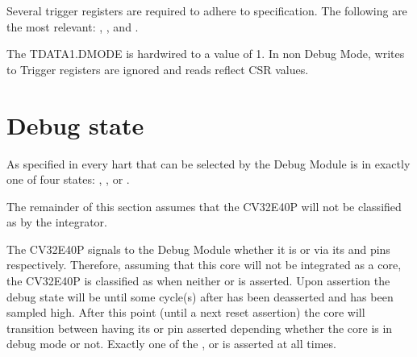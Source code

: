 \documentclass[letterpaper,10pt,english]{sphinxmanual}
\begin{document}
\sphinxAtStartPar
Several trigger registers are required to adhere to specification. The following are the most relevant: {\hyperref[\detokenize{control_status_registers:csr-tselect}]{}}, {\hyperref[\detokenize{control_status_registers:csr-tdata1}]{}},  {\hyperref[\detokenize{control_status_registers:csr-tdata2}]{}} and {\hyperref[\detokenize{control_status_registers:csr-tinfo}]{}}.

\sphinxAtStartPar
The TDATA1.DMODE is hardwired to a value of 1. In non Debug Mode, writes to Trigger registers are ignored and reads reflect CSR values.


\section{Debug state}
\label{\detokenize{debug:debug-state}}
\sphinxAtStartPar
As specified in  every hart that can be selected by
the Debug Module is in exactly one of four states: , ,  or .

\sphinxAtStartPar
The remainder of this section assumes that the CV32E40P will not be classified as  by the integrator.

\sphinxAtStartPar
The CV32E40P signals to the Debug Module whether it is  or  via its  and  pins
respectively. Therefore, assuming that this core will not be integrated as a  core, the CV32E40P is classified as 
when neither  or  is asserted. Upon  assertion the debug state will be  until some
cycle(s) after  has been deasserted and  has been sampled high. After this point (until a next reset assertion) the
core will transition between having its  or  pin asserted depending whether the core is in debug mode or not.
Exactly one of the ,  or  is asserted at all times.
\end{document}
